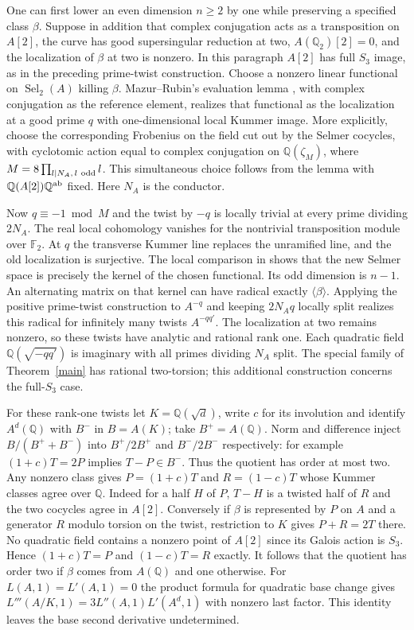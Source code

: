 \documentclass[11pt]{article}
\newcommand{\Q}{\mathbb Q}\newcommand{\Z}{\mathbb Z}\newcommand{\F}{\mathbb F}
\DeclareMathOperator{\Sel}{Sel}\DeclareMathOperator{\Br}{Br}
\begin{document}
One can first lower an even dimension $n\ge2$ by one while preserving a specified class $\beta$. Suppose in addition that complex conjugation acts as a transposition on $A[2]$, the curve has good supersingular reduction at two, $A(\Q_2)[2]=0$, and the localization of $\beta$ at two is nonzero. In this paragraph $A[2]$ has full $S_3$ image, as in the preceding prime-twist construction. Choose a nonzero linear functional on $\Sel_2(A)$ killing $\beta$. Mazur--Rubin's evaluation lemma \cite[Lem.~3.5]{mr}, with complex conjugation as the reference element, realizes that functional as the localization at a good prime $q$ with one-dimensional local Kummer image. More explicitly, choose the corresponding Frobenius on the field cut out by the Selmer cocycles, with cyclotomic action equal to complex conjugation on $\Q(\zeta_M)$, where $M=8\prod_{l\mid N_A,\,l\ {\rm odd}} l$. This simultaneous choice follows from the lemma with $\Q(A[2])\Q^{\rm ab}$ fixed. Here $N_A$ is the conductor.

Now $q\equiv-1\bmod M$ and the twist by $-q$ is locally trivial at every prime dividing $2N_A$. The real local cohomology vanishes for the nontrivial transposition module over $\F_2$. At $q$ the transverse Kummer line replaces the unramified line, and the old localization is surjective. The local comparison in \cite[Prop.~3.3]{mr} shows that the new Selmer space is precisely the kernel of the chosen functional. Its odd dimension is $n-1$. An alternating matrix on that kernel can have radical exactly $\langle\beta\rangle$. Applying the positive prime-twist construction to $A^{-q}$ and keeping $2N_Aq$ locally split realizes this radical for infinitely many twists $A^{-qq'}$. The localization at two remains nonzero, so these twists have analytic and rational rank one. Each quadratic field $\Q(\sqrt{-qq'})$ is imaginary with all primes dividing $N_A$ split. The special family of Theorem~\ref{main} has rational two-torsion; this additional construction concerns the full-$S_3$ case.

For these rank-one twists let $K=\Q(\sqrt d)$, write $c$ for its involution and identify $A^d(\Q)$ with $B^-$ in $B=A(K)$; take $B^+=A(\Q)$. Norm and difference inject $B/(B^++B^-)$ into $B^+/2B^+$ and $B^-/2B^-$ respectively: for example $(1+c)T=2P$ implies $T-P\in B^-$. Thus the quotient has order at most two. Any nonzero class gives $P=(1+c)T$ and $R=(1-c)T$ whose Kummer classes agree over $\Q$. Indeed for a half $H$ of $P$, $T-H$ is a twisted half of $R$ and the two cocycles agree in $A[2]$. Conversely if $\beta$ is represented by $P$ on $A$ and a generator $R$ modulo torsion on the twist, restriction to $K$ gives $P+R=2T$ there. No quadratic field contains a nonzero point of $A[2]$ since its Galois action is $S_3$. Hence $(1+c)T=P$ and $(1-c)T=R$ exactly. It follows that the quotient has order two if $\beta$ comes from $A(\Q)$ and one otherwise. For $L(A,1)=L'(A,1)=0$ the product formula for quadratic base change gives $L'''(A/K,1)=3L''(A,1)L'(A^d,1)$ with nonzero last factor. This identity leaves the base second derivative undetermined.
\end{document}

